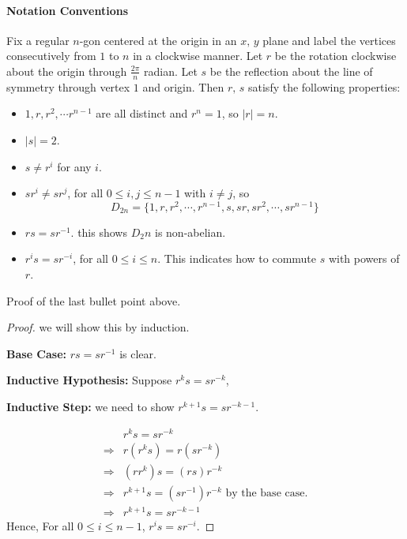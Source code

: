 \documentclass[paper=a4, fontsize=11pt]{scrartcl}
\numberwithin{equation}{section}		%
\numberwithin{figure}{section}			%
\numberwithin{table}{section}				%
\theoremstyle{definition}
\theoremstyle{remark}
\theoremstyle{example}
\begin{document}
\paragraph{Notation Conventions}

Fix a regular $n$-gon centered at the origin in an $x,\,y$ plane and label the vertices consecutively from $1$ to $n$ in a clockwise manner. Let $r$ be the rotation clockwise about the origin through $\tfrac{2\pi}{n}$ radian. Let $s$ be the reflection about the line of symmetry through vertex $1$ and origin. Then $r,\, s$ satisfy the following properties:

\begin{itemize}
    \item $1, r,r^2, \cdots r^{n-1}$ are all distinct and $r^n = 1$, so $\lvert r \rvert = n$.
    \item $\lvert s \rvert = 2$.
    \item $s \neq r^i$ for any $i$.
    \item $sr^i \neq sr^j$, for all $0 \leq i,j \leq n-1$ with $i\neq j$, so 
    \begin{equation}
        D_{2n} = \{1,r,r^2,\cdots ,r^{n-1},s,sr,sr^2,\cdots,sr^{n-1}\}
    \end{equation}
    \item $rs = sr^{-1}$. this shows $D_2n$ is non-abelian.
    \item $r^is = sr^{-i}$, for all $0 \leq i \leq n$. This indicates how to commute $s$ with powers of $r$.
\end{itemize}

Proof of the last bullet point above.

\begin{proof}
    we will show this by induction. 
    
    \textbf{Base Case:} $rs = sr^{-1}$ is clear.
    
    \textbf{Inductive Hypothesis:} Suppose $r^{k}s = sr^{-k}$,
    
    \textbf{Inductive Step:} we need to show $r^{k+1}s = sr^{-k-1}$.
    
    \begin{equation}
        \begin{aligned}
            & r^ks = sr^{-k}\\
            \Rightarrow & r(r^ks) = r(sr^{-k})\\
            \Rightarrow & (rr^k)s = (rs)r^{-k}\\
            \Rightarrow & r^{k+1}s = (sr^{-1})r^{-k} \text{ by the base case.}\\
            \Rightarrow & r^{k+1}s = sr^{-k-1}
        \end{aligned}
    \end{equation}
    Hence, For all $0 \leq i \leq n-1$, $r^is = sr^{-i}$.
\end{proof}
\end{document}
